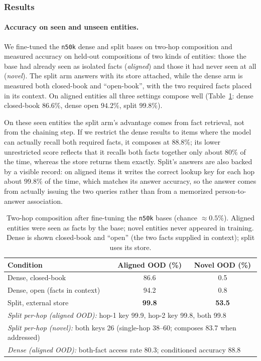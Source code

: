 \documentclass{article}
\begin{document}
\subsubsection{Results}
\label{sec:twohop-results}

\paragraph{Accuracy on seen and unseen entities.}
We fine-tuned the \texttt{n50k} dense and split bases on two-hop composition and measured accuracy on held-out compositions of two kinds of entities: those the base had already seen as isolated facts (\emph{aligned}) and those it had never seen at all (\emph{novel}). The split arm answers with its store attached, while the dense arm is measured both closed-book and ``open-book'', with the two required facts placed in its context. On aligned entities all three settings compose well (Table~\ref{tab:twohop}: dense closed-book $86.6\%$, dense open $94.2\%$, split $99.8\%$).

On these seen entities the split arm's advantage comes from fact retrieval, not from the chaining step. If we restrict the dense results to items where the model can actually recall both required facts, it composes at $88.8\%$; its lower unrestricted score reflects that it recalls both facts together only about $80\%$ of the time, whereas the store returns them exactly. Split's answers are also backed by a visible record: on aligned items it writes the correct lookup key for each hop about $99.8\%$ of the time, which matches its answer accuracy, so the answer comes from actually issuing the two queries rather than from a memorized person-to-answer association.

\begin{table}[!htbp]
\centering
\small
\caption{Two-hop composition after fine-tuning the \texttt{n50k} bases (chance $\approx 0.5\%$). Aligned entities were seen as facts by the base; novel entities never appeared in training. Dense is shown closed-book and ``open'' (the two facts supplied in context); split uses its store.}
\label{tab:twohop}
\begin{tabular}{lcc}
\toprule Condition & Aligned OOD (\%) & Novel OOD (\%) \\
\midrule Dense, closed-book & 86.6 & 0.5 \\
Dense, open (facts in context) & 94.2 & 0.8 \\
Split, external store & \textbf{99.8} & \textbf{53.5} \\
\midrule
\multicolumn{3}{l}{\emph{Split per-hop (aligned OOD):} hop-1 key 99.9, hop-2 key 99.8, both 99.8} \\
\multicolumn{3}{l}{\emph{Split per-hop (novel):} both keys 26 (single-hop 38--60; composes 83.7 when addressed)} \\
\multicolumn{3}{l}{\emph{Dense (aligned OOD):} both-fact access rate 80.3; conditioned accuracy 88.8} \\
\bottomrule
\end{tabular}
\end{table}
\end{document}
